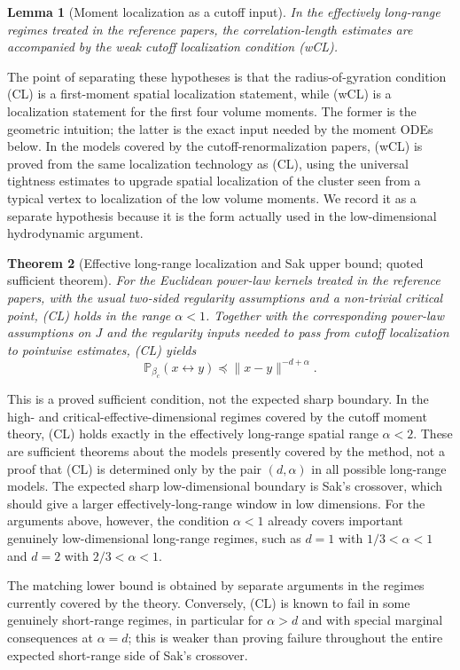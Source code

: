 \documentclass[11pt,reqno]{book}
\numberwithin{equation}{chapter}
\theoremstyle{plain}
\newtheorem{theorem}{Theorem}[chapter]
\newtheorem{lemma}[theorem]{Lemma}
\theoremstyle{definition}
\theoremstyle{remark}
\renewcommand{\P}{\mathbb P}
\newcommand{\1}{\mathbf 1}
\newcommand{\norm}[1]{\lVert #1\rVert}
\newcommand{\pre}{\preceq}
\begin{document}
\begin{lemma}[Moment localization as a cutoff input]
In the effectively long-range regimes treated in the reference papers, the
correlation-length estimates are accompanied by the weak cutoff localization
condition (wCL).
\end{lemma}

The point of separating these hypotheses is that the radius-of-gyration
condition (CL) is a first-moment spatial localization statement, while (wCL)
is a localization statement for the first four volume moments. The former is
the geometric intuition; the latter is the exact input needed by the moment
ODEs below. In the models covered by the cutoff-renormalization papers, (wCL)
is proved from the same localization technology as (CL), using the universal
tightness estimates to upgrade spatial localization of the cluster seen from
a typical vertex to localization of the low volume moments. We record it as a
separate hypothesis because it is the form actually used in the
low-dimensional hydrodynamic argument.

\begin{theorem}[Effective long-range localization and Sak upper bound; quoted sufficient theorem]
For the Euclidean power-law kernels treated in the reference papers, with the
usual two-sided regularity assumptions and a non-trivial critical point, (CL)
holds in the range \(\alpha<1\). Together with the corresponding power-law
assumptions on \(J\) and the regularity inputs needed to pass from cutoff
localization to pointwise estimates, (CL) yields
\[
  \P_{\beta_c}(x\leftrightarrow y)\pre \norm{x-y}^{-d+\alpha}.
\]
\end{theorem}

This is a proved sufficient condition, not the expected sharp boundary. In
the high- and critical-effective-dimensional regimes covered by the cutoff
moment theory, (CL) holds exactly in the effectively long-range spatial range
\(\alpha<2\). These are sufficient theorems about the models presently
covered by the method, not a proof that (CL) is determined only by the pair
\((d,\alpha)\) in all possible long-range models. The expected sharp
low-dimensional boundary is Sak's crossover, which should give a larger
effectively-long-range window in low dimensions. For the arguments above,
however, the condition $\alpha<1$ already covers important genuinely
low-dimensional long-range regimes, such as $d=1$ with $1/3<\alpha<1$ and
$d=2$ with $2/3<\alpha<1$.

The matching lower bound is obtained by separate arguments in the regimes
currently covered by the theory. Conversely, (CL) is known to fail in some
genuinely short-range regimes, in particular for $\alpha>d$ and with special
marginal consequences at $\alpha=d$; this is weaker than proving failure
throughout the entire expected short-range side of Sak's crossover.
\end{document}

